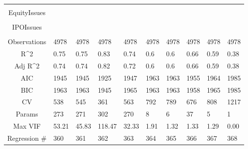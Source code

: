 \documentclass{article}
\begin{document}
\begin{table}[H]
\begin{tabular}{|clllllllll|}
   &  &  &  &  &  &  &  &  &  \\ 
  EquityIssues &  &  &  &  &  &  &  &  &  \\ 
   &  &  &  &  &  &  &  &  &  \\ 
  IPOIssues &  &  &  &  &  &  &  &  &  \\ 
   &  &  &  &  &  &  &  &  &  \\ 
  \hline 
 Observations & 4978 & 4978 & 4978 & 4978 & 4978 & 4978 & 4978 & 4978 & 4978 \\ 
  R^2 & 0.75 & 0.75 & 0.83 & 0.74 & 0.6 & 0.6 & 0.66 & 0.59 & 0.38 \\ 
  Adj R^2 & 0.74 & 0.74 & 0.82 & 0.72 & 0.6 & 0.6 & 0.66 & 0.59 & 0.38 \\ 
  AIC & 1945 & 1945 & 1925 & 1947 & 1963 & 1963 & 1955 & 1964 & 1985 \\ 
  BIC & 1963 & 1963 & 1945 & 1965 & 1963 & 1963 & 1958 & 1965 & 1985 \\ 
  CV & 538 & 545 & 361 & 563 & 792 & 789 & 676 & 808 & 1217 \\ 
  Params & 273 & 271 & 302 & 270 & 8 & 6 & 37 & 5 & 1 \\ 
  Max VIF & 53.21 & 45.83 & 118.47 & 32.33 & 1.91 & 1.32 & 1.33 & 1.29 & 0.00 \\ 
  Regression \# & 360 & 361 & 362 & 363 & 364 & 365 & 366 & 367 & 368 \\ 
   \hline
\end{tabular}
 
\end{table}
\end{document}
